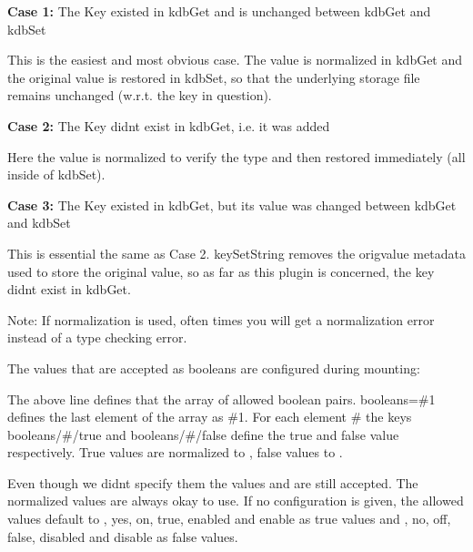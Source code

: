 \begin{DoxyItemize}
\item {\bfseries{Case 1\+:}} The Key existed in kdb\+Get and is unchanged between {\ttfamily kdb\+Get} and {\ttfamily kdb\+Set}

This is the easiest and most obvious case. The value is normalized in {\ttfamily kdb\+Get} and the original value is restored in {\ttfamily kdb\+Set}, so that the underlying storage file remains unchanged (w.\+r.\+t. the key in question).
\item {\bfseries{Case 2\+:}} The Key didn\textquotesingle{}t exist in {\ttfamily kdb\+Get}, i.\+e. it was added

Here the value is normalized to verify the type and then restored immediately (all inside of {\ttfamily kdb\+Set}).
\item {\bfseries{Case 3\+:}} The Key existed in {\ttfamily kdb\+Get}, but its value was changed between kdb\+Get and kdb\+Set

This is essential the same as Case 2. {\ttfamily key\+Set\+String} removes the {\ttfamily origvalue} metadata used to store the original value, so as far as this plugin is concerned, the key didn\textquotesingle{}t exist in {\ttfamily kdb\+Get}.
\end{DoxyItemize}

Note\+: If normalization is used, often times you will get a normalization error instead of a type checking error.

The values that are accepted as {\ttfamily boolean}s are configured during mounting\+:


\begin{DoxyCode}{0}
\end{DoxyCode}


The above line defines that the array of allowed boolean pairs. {\ttfamily booleans=\#1} defines the last element of the array as {\ttfamily \#1}. For each element {\ttfamily \#} the keys {\ttfamily booleans/\#/true} and {\ttfamily booleans/\#/false} define the true and false value respectively. True values are normalized to {}, false values to {}.

Even though we didn\textquotesingle{}t specify them the values {} and {} are still accepted. The normalized values are always okay to use. If no configuration is given, the allowed values default to {}, {\ttfamily yes}, {\ttfamily on}, {\ttfamily true}, {\ttfamily enabled} and {\ttfamily enable} as true values and {}, {\ttfamily no}, {\ttfamily off}, {\ttfamily false}, {\ttfamily disabled} and {\ttfamily disable} as false values.

